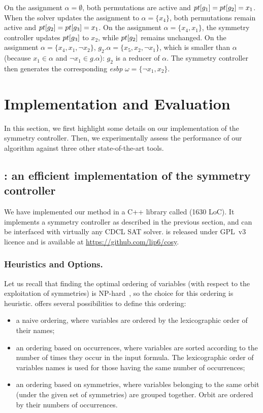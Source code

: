  On the assignment $\alpha = \emptyset$, both permutations are active and
 $pt[g_1] = pt[g_2] = x_1$. When the solver updates the assignment to $\alpha = \{ x_4\}$, both permutations remain active and $pt[g_2] = pt[g_3] = x_1$. On the assignment $\alpha = \{  x_4,  x_1\}$, the symmetry controller updates $pt[g_3]$ to $x_2$, while $pt[g_2]$ remains unchanged. On the assignment $\alpha = \{  x_4,  x_1, \neg x_2 \}$, $g_2.\alpha = \{  x_5,  x_2, \neg x_1
 \}$, which is smaller than $\alpha$ (because $ x_1 \in \alpha$ and $ \neg x_1 \in g.\alpha$):
 $g_2$ is a reducer of $\alpha$. The symmetry controller then generates the
 corresponding \textit{esbp} $\omega = \{ \neg x_1, x_2 \}$.
 
 
\section{Implementation and Evaluation}\label{sec:eval}

In this section, we first highlight some details on our implementation of the
symmetry controller. Then, we experimentally assess the performance of our
algorithm against three other state-of-the-art tools.

\subsection{\libdsb{}: an efficient implementation of the symmetry controller}

We have implemented our method in a C++ library called \libdsb{} (1630 LoC). It
implements a symmetry controller as described in the previous section, and can
be interfaced with virtually any CDCL SAT solver. \libdsb{} is released under
GPL~v3 licence and is available at \url{https://github.com/lip6/cosy}.

\subsubsection{Heuristics and Options.} Let us recall that finding the optimal
ordering of variables (with respect to the exploitation of symmetries) is
NP-hard~\cite{luks.04.amai}, so the choice for this ordering is heuristic.
\libdsb{} offers several possibilities to define this ordering:

\begin{itemize}
	
	\item a naive ordering, where variables are ordered by the lexicographic
	order of their names;
	
	\item an ordering based on occurrences, where variables are sorted
	according to the number of times they occur in the input formula. The
	lexicographic order of variables names is used for those having the same number of
	occurrences;
	
	\item an ordering based on symmetries, where variables belonging to the
	same orbit (under the given set of symmetries) are grouped together. Orbit are
	ordered by their numbers of occurrences.
	
\end{itemize}

